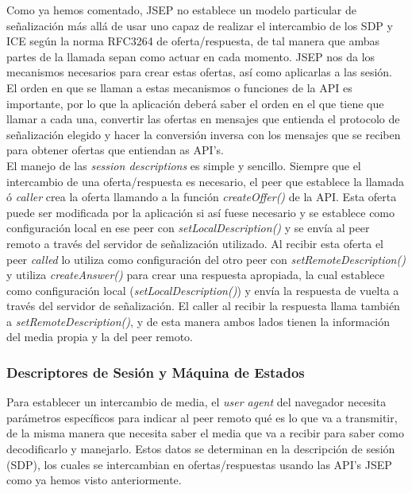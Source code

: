 Como ya hemos comentado, JSEP no establece un modelo particular de señalización más allá de usar uno capaz de realizar el intercambio de los SDP y ICE según la norma RFC3264 de oferta/respuesta, de tal manera que ambas partes de la llamada sepan como actuar en cada momento. JSEP nos da los mecanismos necesarios para crear estas ofertas, así como aplicarlas a las sesión.\\

El orden en que se llaman a estas mecanismos o funciones de la API es importante, por lo que la aplicación deberá saber el orden en el que tiene que llamar a cada una, convertir las ofertas en mensajes que entienda el protocolo de señalización elegido y hacer la conversión inversa con los mensajes que se reciben para obtener ofertas que entiendan as API's.\\

El manejo de las \textit{session descriptions} es simple y sencillo. Siempre que el intercambio de una oferta/respuesta es necesario, el peer que establece la llamada ó \textit{caller} crea la oferta llamando a la función \emph{createOffer()} de la API. Esta oferta puede ser modificada por la aplicación si así fuese necesario y se establece como configuración local en ese peer con \emph{setLocalDescription()} y se envía al peer remoto a través del servidor de señalización utilizado. Al recibir esta oferta el peer \textit{called} lo utiliza como configuración del otro peer con \emph{setRemoteDescription()} y utiliza \emph{createAnswer()} para crear una respuesta apropiada, la cual establece como configuración local (\emph{setLocalDescription()}) y envía la respuesta de vuelta a través del servidor de señalización. El caller al recibir la respuesta llama también a \emph{setRemoteDescription()}, y de esta manera ambos lados tienen la información del media propia y la del peer remoto.\\


\subsubsection{Descriptores de Sesión y Máquina de Estados}

Para establecer un intercambio de media, el \textit{user agent} del navegador necesita parámetros específicos para indicar al peer remoto qué es lo que va a transmitir, de la misma manera que necesita saber el media que va a recibir para saber como decodificarlo y manejarlo. Estos datos se determinan en la descripción de sesión (SDP), los cuales se intercambian en ofertas/respuestas usando las API's JSEP como ya hemos visto anteriormente.\\


